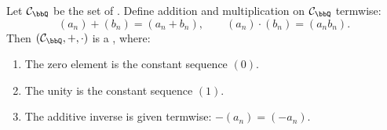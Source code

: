 \begin{proposition} \label{proposition:the_set_of_cauchy_sequences_of_rational_numbers_form_commutative_ring}
    Let $\mathcal{C}_\bbQ$ be the set of . Define addition and multiplication on $\mathcal{C}_\bbQ$ termwise:
    $$(a_n) + (b_n) = (a_n + b_n), \qquad (a_n) \cdot (b_n) = (a_n b_n).$$
    Then $(\mathcal{C}_\bbQ, +, \cdot)$ is a , where:
    \begin{enumerate}
        \item The zero element is the constant sequence $(0)$.
        \item The unity is the constant sequence $(1)$.
        \item The additive inverse is given termwise: $-(a_n) = (-a_n)$.
    \end{enumerate}
\end{proposition}

